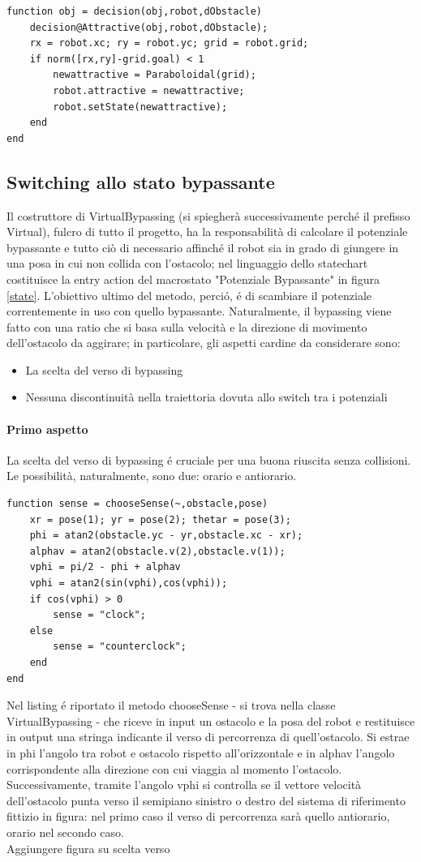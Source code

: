 \documentclass[14pt,a4paper]{extarticle}
\begin{document}
\begin{lstlisting}
function obj = decision(obj,robot,dObstacle)
	decision@Attractive(obj,robot,dObstacle);
	rx = robot.xc; ry = robot.yc; grid = robot.grid;
	if norm([rx,ry]-grid.goal) < 1
		newattractive = Paraboloidal(grid);
		robot.attractive = newattractive;
		robot.setState(newattractive);
	end
end
\end{lstlisting}

\subsection{Switching allo stato bypassante}
Il costruttore di VirtualBypassing (si spiegherà successivamente perché il prefisso Virtual), fulcro di tutto il progetto, ha la responsabilità di calcolare il potenziale bypassante e tutto ciò di necessario affinché il robot sia in grado di giungere in una posa in cui non collida con l'ostacolo; nel linguaggio dello statechart costituisce la entry action del macrostato "Potenziale Bypassante" in figura \ref{state}. L'obiettivo ultimo del metodo, perció, é di scambiare il potenziale correntemente in uso con quello bypassante. Naturalmente, il bypassing viene fatto con una ratio che si basa sulla velocità e la direzione di movimento dell'ostacolo da aggirare; in particolare, gli aspetti cardine da considerare sono:
\begin{itemize}
\item La scelta del verso di bypassing
\item Nessuna discontinuità nella traiettoria dovuta allo switch tra i potenziali
\end{itemize}

\paragraph{Primo aspetto}
La scelta del verso di bypassing é cruciale per una buona riuscita senza collisioni. Le possibilità, naturalmente, sono due: orario e antiorario.
\begin{lstlisting}
function sense = chooseSense(~,obstacle,pose)
	xr = pose(1); yr = pose(2); thetar = pose(3);
	phi = atan2(obstacle.yc - yr,obstacle.xc - xr);
	alphav = atan2(obstacle.v(2),obstacle.v(1));
	vphi = pi/2 - phi + alphav
	vphi = atan2(sin(vphi),cos(vphi));
	if cos(vphi) > 0
		sense = "clock";
	else
		sense = "counterclock";
	end
end
\end{lstlisting} 
Nel listing é riportato il metodo chooseSense - si trova nella classe VirtualBypassing - che riceve in input un ostacolo e la posa del robot e restituisce in output una stringa indicante il verso di percorrenza di quell'ostacolo. Si estrae in phi l'angolo tra robot e ostacolo rispetto all'orizzontale e in alphav l'angolo corrispondente alla direzione con cui viaggia al momento l'ostacolo. Successivamente, tramite l'angolo vphi si controlla se il vettore velocità dell'ostacolo punta verso il semipiano sinistro o destro del sistema di riferimento fittizio in figura: nel primo caso il verso di percorrenza sarà quello antiorario, orario nel secondo caso.\\
Aggiungere figura su scelta verso 
\end{document}
